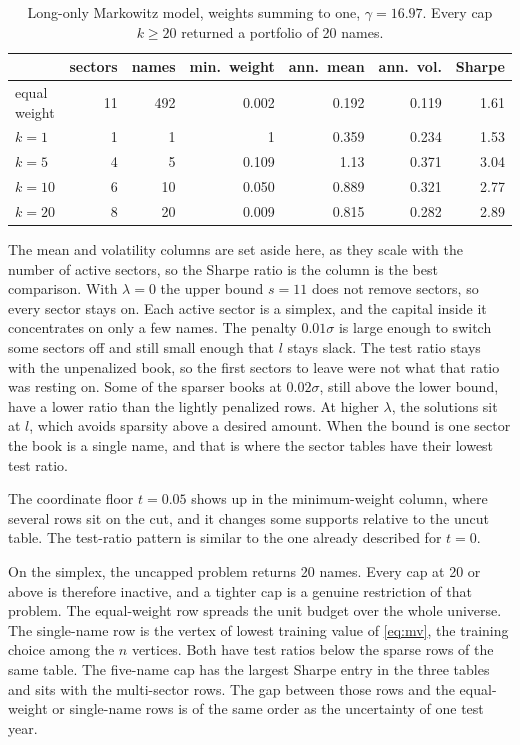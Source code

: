 \documentclass[11pt,a4paper]{article}
\theoremstyle{plain}
\theoremstyle{definition}
\theoremstyle{remark}
\begin{document}
\begin{table}[ht]
  \centering
  \setlength{\belowcaptionskip}{10pt}
  \caption{Long-only Markowitz model, weights summing to one, \(\gamma=16.97\).
    Every cap \(k\ge 20\) returned a portfolio of 20 names.
  }
  \label{tab:markowitz}
  \small
  \begin{tabular}{@{}lrrrrrr@{}}
    \toprule
                 & sectors & names & min.\ weight & ann.\ mean & ann.\ vol. & Sharpe \\
    \midrule
    equal weight & 11      & 492   & 0.002        & 0.192      & 0.119      & 1.61   \\
    \(k=1\)      & 1       & 1     & 1            & 0.359      & 0.234      & 1.53   \\
    \(k=5\)      & 4       & 5     & 0.109        & 1.13       & 0.371      & 3.04   \\
    \(k=10\)     & 6       & 10    & 0.050        & 0.889      & 0.321      & 2.77   \\
    \(k=20\)     & 8       & 20    & 0.009        & 0.815      & 0.282      & 2.89   \\
    \bottomrule
  \end{tabular}
\end{table}

The mean and volatility columns are set aside here, as they scale with the number of active sectors, so the Sharpe ratio is the column is the best comparison.
With \(\lambda=0\) the upper bound \(s=11\) does not remove sectors, so every sector stays on.
Each active sector is a simplex, and the capital inside it concentrates on only a few names.
The penalty \(0.01\sigma\) is large enough to switch some sectors off and still small enough that \(l\) stays slack.
The test ratio stays with the unpenalized book, so the first sectors to leave were not what that ratio was resting on.
Some of the sparser books at \(0.02\sigma\), still above the lower bound, have a lower ratio than the lightly penalized rows.
At higher \(\lambda\), the solutions sit at \(l\), which avoids sparsity above a desired amount.
When the bound is one sector the book is a single name, and that is where the sector tables have their lowest test ratio.

The coordinate floor \(t=0.05\) shows up in the minimum-weight column, where several rows sit on the cut, and it changes some supports relative to the uncut table.
The test-ratio pattern is similar to the one already described for \(t=0\).

On the simplex, the uncapped problem returns 20 names.
Every cap at 20 or above is therefore inactive, and a tighter cap is a genuine restriction of that problem.
The equal-weight row spreads the unit budget over the whole universe.
The single-name row is the vertex of lowest training value of \eqref{eq:mv}, the training choice among the \(n\) vertices.
Both have test ratios below the sparse rows of the same table.
The five-name cap has the largest Sharpe entry in the three tables and sits with the multi-sector rows.
The gap between those rows and the equal-weight or single-name rows is of the same order as the uncertainty of one test year.
\end{document}

